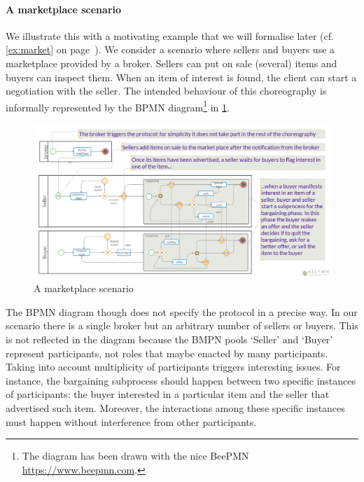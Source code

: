 % 
\paragraph{A marketplace scenario}
We illustrate this with a motivating example that we will formalise
later (cf. \cref{ex:market} on page~\pageref{ex:market}).
%
We consider a scenario where sellers and buyers use a marketplace
provided by a broker.
%
Sellers can put on sale (several) items and buyers can inspect them.
%
When an item of interest is found, the client can start a negotiation
with the seller.
%
The intended behaviour of this choreography is informally represented
by the BPMN diagram\footnote{The diagram has been drawn with the nice
  BeePMN \url{https://www.beepmn.com}.} in \cref{fig:bpmn}.
%
\begin{figure}[t!]\centering
  \includegraphics[scale=.18]{marketplace}
  \caption{A marketplace scenario\label{fig:bpmn}}
\end{figure}
%
The BPMN diagram though does not specify the protocol in a precise
way.
%
In our scenario there is a single broker but an arbitrary number of
sellers or buyers.
%
This is not reflected in the diagram because the BMPN pools `Seller'
and `Buyer' represent participants, not roles that maybe enacted by
many participants.
% 
Taking into account multiplicity of participants triggers interesting
issues.
% 
For instance, the bargaining subprocess should happen between two
specific instances of participants: the buyer interested in a
particular item and the seller that advertised such item.
% 
Moreover, the interactions among these specific instances must happen
without interference from other participants.

